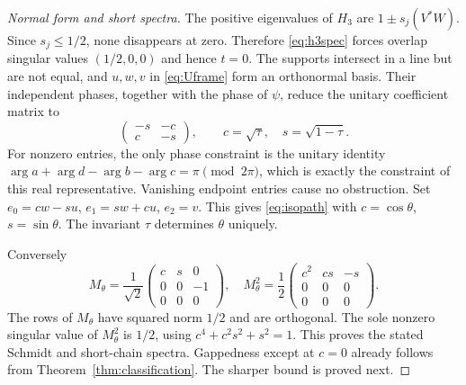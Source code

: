 \documentclass[11pt,a4paper]{article}
\theoremstyle{remark}\newtheorem{remark}[theorem]{Remark}
\begin{document}
\begin{proof}[Normal form and short spectra]
The positive eigenvalues of $H_3$ are $1\pm s_j(V^*W)$. Since $s_j\le1/2$, none disappears at zero. Therefore \eqref{eq:h3spec} forces overlap singular values $(1/2,0,0)$ and hence $t=0$. The supports intersect in a line but are not equal, and $u,w,v$ in \eqref{eq:Uframe} form an orthonormal basis. Their independent phases, together with the phase of $\psi$, reduce the unitary coefficient matrix to
\[
 \begin{pmatrix}-s&-c\\c&-s\end{pmatrix},\qquad
 c=\sqrt\tau,\quad s=\sqrt{1-\tau}.
\]
For nonzero entries, the only phase constraint is the unitary identity
$\arg a+\arg d-\arg b-\arg c=\pi\pmod{2\pi}$, which is exactly the constraint of this real representative. Vanishing endpoint entries cause no obstruction. Set $e_0=cw-su$, $e_1=sw+cu$, $e_2=v$. This gives \eqref{eq:isopath} with $c=\cos\theta$, $s=\sin\theta$. The invariant $\tau$ determines $\theta$ uniquely.

Conversely
\[
 M_\theta=\frac1{\sqrt2}\begin{pmatrix}c&s&0\\0&0&-1\\0&0&0\end{pmatrix},\quad
 M_\theta^2=\frac12\begin{pmatrix}c^2&cs&-s\\0&0&0\\0&0&0\end{pmatrix}.
\]
The rows of $M_\theta$ have squared norm $1/2$ and are orthogonal. The sole nonzero singular value of $M_\theta^2$ is $1/2$, using $c^4+c^2s^2+s^2=1$. This proves the stated Schmidt and short-chain spectra. Gappedness except at $c=0$ already follows from Theorem~\ref{thm:classification}. The sharper bound is proved next.
\end{proof}
\end{document}
